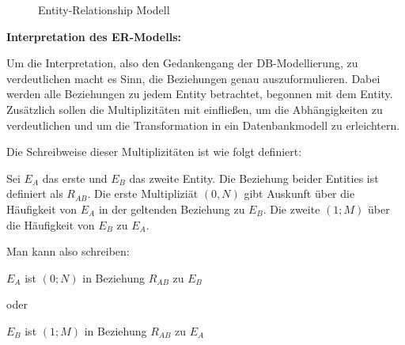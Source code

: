 \begin{center}
\begin{figure}[H]
{
}
\caption[\textbf{Entity-Relationship Modell}]{Entity-Relationship Modell}
\label{fig:ERModell}
\end{figure}
\end{center}

\textbf{Interpretation des \ac{ER-Modell}s:}

Um die Interpretation, also den Gedankengang der \ac{DB}-Modellierung, zu verdeutlichen macht es Sinn, die Beziehungen genau auszuformulieren.
Dabei werden alle Beziehungen zu jedem Entity betrachtet, begonnen mit dem Entity.
Zusätzlich sollen die Multiplizitäten mit einfließen, um die Abhängigkeiten zu verdeutlichen und um die Transformation in ein Datenbankmodell zu erleichtern.

Die Schreibweise dieser Multiplizitäten ist wie folgt definiert:

Sei $E_{A}$ das erste und $E_{B}$ das zweite Entity.
Die Beziehung beider Entities ist definiert als $R_{AB}$. 
Die erste Multipliziät $(0,N)$ gibt Auskunft über die Häufigkeit von $E_{A}$ in der geltenden Beziehung zu $E_{B}$.
Die zweite $(1;M)$ über die Häufigkeit von $E_{B}$ zu $E_{A}$.

Man kann also schreiben:

\begin{center}
$E_{A}$ ist $(0;N)$ in Beziehung $R_{AB}$ zu $E_{B}$

oder

$E_{B}$ ist $(1;M)$ in Beziehung $R_{AB}$ zu $E_{A}$
\end{center}

